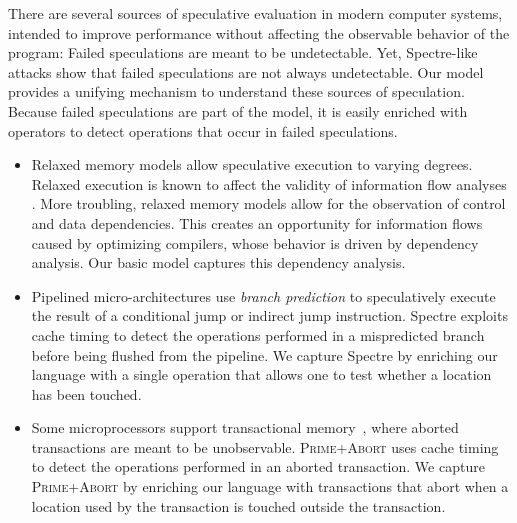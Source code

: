 There are several sources of speculative evaluation in modern computer
systems, intended to improve performance without affecting the observable
behavior of the program: Failed speculations are meant to be
undetectable. Yet, Spectre-like attacks show that failed speculations are not
always undetectable.  Our model provides a unifying mechanism to understand
these sources of speculation.  Because failed speculations are part of the
model, it is easily enriched with operators to detect operations that occur
in failed speculations.
\begin{itemize}
\item Relaxed memory models
  \cite{SparcV9,Manson:2005:JMM:1047659.1040336,Boehm:2008:FCC:1375581.1375591,DBLP:conf/popl/ZhaoNMZ12}
  allow speculative execution to varying degrees. Relaxed execution
  is known to affect the validity of information flow analyses
  \cite{6957104,Vaughan:2012:SIF}.  More troubling, relaxed memory models
  allow for the observation of control and data dependencies. This creates an
  opportunity for information flows caused by optimizing compilers, whose
  behavior is driven by dependency analysis.  Our basic model captures this
  dependency analysis.
\item Pipelined micro-architectures use \emph{branch prediction}
  to speculatively execute the result of
  a conditional jump or indirect jump instruction.
  Spectre \cite{DBLP:journals/corr/abs-1801-01203} exploits
  cache timing to detect the operations performed in a mispredicted branch
  before being flushed from the pipeline.  We capture Spectre by enriching
  our language with a single operation that allows one to test whether a
  location has been touched. %
\item Some microprocessors support transactional
  memory~\cite{ChongSW18}, where aborted transactions are meant to be
  unobservable.  \textsc{Prime+Abort}
  \cite{DBLP:conf/uss/DisselkoenKPT17} uses cache timing to detect the
  operations performed in an aborted transaction.  We capture \textsc{Prime+Abort} by enriching
  our language with transactions that abort when a location used by the
  transaction is touched outside the transaction.
\end{itemize}


